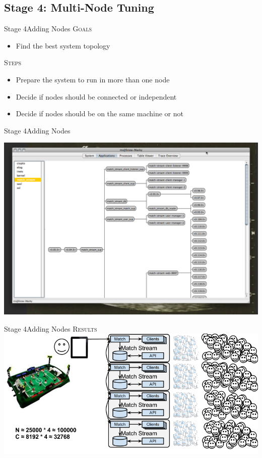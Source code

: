 \documentclass[utf8]{beamer}
\begin{document}
\subsection{Stage 4: Multi-Node Tuning}
\begin{frame}{Stage 4}{Adding Nodes}
	\textsc{Goals}
	\begin{itemize}
		\item Find the best system topology
	\end{itemize}
	\pause
	\textsc{Steps}
	\begin{itemize}
		\item Prepare the system to run in more than one node
		\item Decide if nodes should be connected or independent
		\item Decide if nodes should be on the same machine or not
	\end{itemize}
\end{frame}
\begin{frame}{Stage 4}{Adding Nodes}
	\begin{center}
		\includegraphics[height=.75\textheight]{img/running-late.png}
	\end{center}
\end{frame}
\begin{frame}{Stage 4}{Adding Nodes}
	\textsc{Results}
	\includegraphics[top=-1,width=\textwidth]{img/MatchStream-4.png}
\end{frame}
\end{document}
